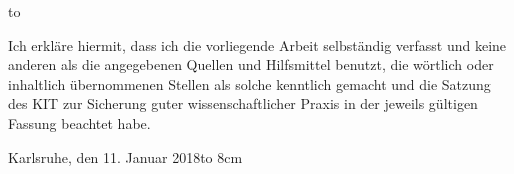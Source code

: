 \thispagestyle{empty}
\vspace*{32\baselineskip}
\hbox to \textwidth{\hrulefill}
\par
Ich erkläre hiermit, dass ich die vorliegende Arbeit selbständig verfasst und
keine anderen als die angegebenen Quellen und Hilfsmittel benutzt,
die wörtlich oder inhaltlich übernommenen Stellen als solche kenntlich
gemacht und die Satzung des KIT zur Sicherung guter wissenschaftlicher
Praxis in der jeweils gültigen Fassung beachtet habe.

\vspace*{2cm}
Karlsruhe, den 11. Januar 2018\hfill \hbox to 8cm{\hrulefill}

\clearpage
